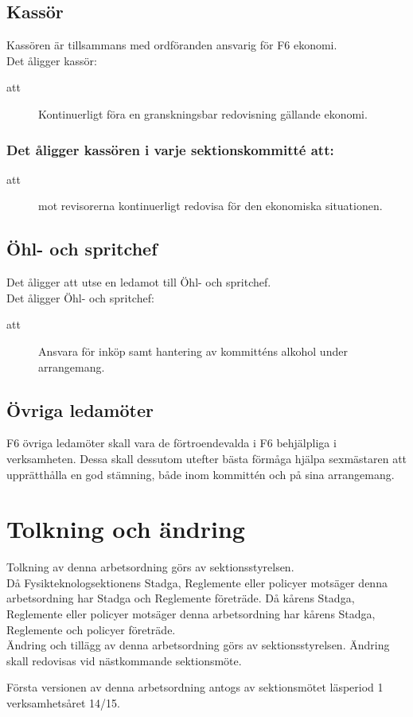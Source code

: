 \subsection{Kassör}
Kassören är tillsammans med ordföranden ansvarig för F6 ekonomi.\\ 
Det åligger \forening kassör:
\begin{description}
\item[att] Kontinuerligt föra en granskningsbar redovisning gällande \forening ekonomi.
\end{description}

\subsubsection{Det åligger kassören i varje sektionskommitté att:}
\begin{description}
\item[att] mot revisorerna kontinuerligt redovisa för den ekonomiska situationen.

\end{description}

\subsection{Öhl- och spritchef}
Det åligger \forening att utse en ledamot till Öhl- och spritchef.\\
Det åligger \forening Öhl- och spritchef:
\begin{description}
\item[att] Ansvara för inköp samt hantering av kommitténs alkohol under arrangemang.
\end{description}

\subsection{Övriga ledamöter}
F6 övriga ledamöter skall vara de förtroendevalda i F6 behjälpliga i verksamheten. Dessa skall dessutom utefter bästa förmåga hjälpa sexmästaren att upprätthålla en god stämning, både inom kommittén och på sina arrangemang.

\section{Tolkning och ändring}
Tolkning av denna arbetsordning görs av sektionsstyrelsen.\\ Då Fysikteknologsektionens Stadga, Reglemente eller policyer motsäger denna arbetsordning har Stadga och Reglemente företräde. Då kårens Stadga, Reglemente eller policyer motsäger denna arbetsordning har kårens Stadga, Reglemente och policyer företräde.\\
Ändring och tillägg av denna arbetsordning görs av sektionsstyrelsen. Ändring skall redovisas vid nästkommande sektionsmöte. 

Första versionen av denna arbetsordning antogs av sektionsmötet läsperiod 1 verksamhetsåret 14/15.

\newpage
